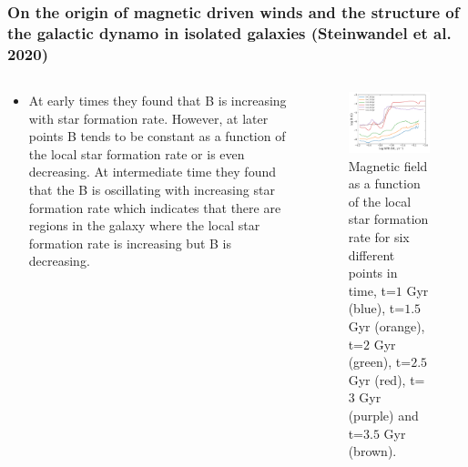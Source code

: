 \documentclass[10pt,aspectratio=169]{beamer}
\begin{document}
\begin{frame}
	\frametitle{ On the origin of magnetic driven winds and the structure of the galactic dynamo in isolated galaxies (Steinwandel et al. 2020)}
	\begin{columns}
		\begin{column}{0.52\textwidth}
			\begin{itemize}
				\item At early times they found that B is increasing with star formation rate. However, at later points B tends to be constant as a function of the local star formation rate or is even decreasing. At intermediate time they found that the B is oscillating with increasing star formation rate which indicates that there are regions in the galaxy where the local star formation rate is increasing but B is decreasing.
			\end{itemize}
		\end{column}
		\begin{column}{0.46\textwidth}
			\begin{figure}
				\includegraphics[width=1.1\textwidth]{./images/sfr_b_new.pdf}
				\caption{Magnetic field as a function of the local star formation rate for six different points in time, t=$1$ Gyr (blue), t=$1.5$ Gyr (orange), t=$2$ Gyr (green),  t=$2.5$ Gyr (red),  t=$3$ Gyr (purple) and t=$3.5$ Gyr (brown).}
			\end{figure}
		\end{column}
	\end{columns}
\end{frame}
\end{document}
